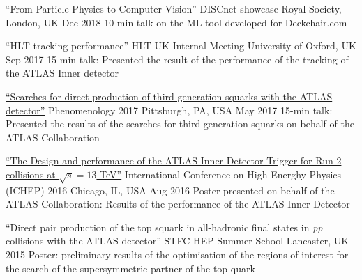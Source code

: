 \begin{cventries}
  \cventry
    {``From Particle Physics to Computer Vision''}
    {DISCnet showcase}
    {Royal Society, London, UK}
    {Dec 2018}
    {10-min talk on the ML tool developed for Deckchair.com}

  \cventry
    {``HLT tracking performance''}
    {HLT-UK Internal Meeting}
    {University of Oxford, UK}
    {Sep 2017}
    {15-min talk: Presented the result of the performance of the tracking of the ATLAS Inner detector}

  \cventry
    {
    \href{http://cds.cern.ch/record/2263055/files/ATL-PHYS-SLIDE-2017-220.pdf}{``Searches for direct production of third generation squarks with the ATLAS detector''}
    }
    {Phenomenology 2017}
    {Pittsburgh, PA, USA}
    {May 2017}
    {15-min talk: Presented the results of the searches for third-generation squarks on behalf of the ATLAS Collaboration}

  \cventry
    {
    \href{https://indico.cern.ch/event/432527/contributions/1071672/attachments/1317672/1974610/FMiano-IDTrigger-ICHEP.pdf}
    {``The Design and performance of the ATLAS Inner Detector Trigger for Run 2 collisions at $\sqrt{s} = 13$ TeV''}
    }
    {International Conference on High Energhy Physics (ICHEP) 2016}
    {Chicago, IL, USA}
    {Aug 2016}
    {Poster presented on behalf of the ATLAS Collaboration: Results of the performance of the ATLAS Inner Detector}

  \cventry
    {``Direct pair production of the top squark in all-hadronic final states in \emph{pp} collisions with the ATLAS detector''}
    {STFC HEP Summer School}
    {Lancaster, UK}
    {2015}
    {Poster: preliminary results of the optimisation of the regions of interest for the search of the supersymmetric partner of the top quark}
\end{cventries}